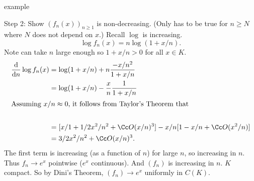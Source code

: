 \documentclass[class=article, crop=false]{standalone}
\begin{document}
\begin{understandingcheck}{example}
\begin{pf}
    Step 2: Show $(f_n(x))_{n \geq 1}$ is non-decreasing. (Only has to be true for $n \geq N$ where $N$ does not depend on $x$.) Recall $\log$ is increasing.
      \[
        \log f_n(x) = n \log (1+x/n).
      \]
    Note can take $n$ large enough so $1+x/n > 0$ for all $x \in K$.
      \begin{align*}
        \frac{\mathrm d}{\mathrm d n} \log f_n(x) &= \log(1+x/n)+ n \frac{-x/n^2}{1+x/n} \\
        &= \log(1+x/n)-\frac{x}{n} \frac{1}{1+x/n} \\
        \intertext{Assuming $x/n \approx 0$, it follows from Taylor's Theorem that } \\
        &= [x/1 + 1/2 x^2/n^2 + \Cc O (x/n)^3] - x/n [1-x/n + \Cc O(x^2/n)] \\
        &= 3/2 x^2/n^2 + \Cc O(x/n)^3.
      \end{align*}
    The first term is increasing (as a function of $n$) for large $n$, so increasing in $n$. Thus $f_n \to e^x$ pointwise ($e^x$ continuous). And $(f_n)$ is increasing in $n$. $K$ compact. So by Dini's Theorem, $(f_n) \to e^x$ uniformly in $C(K)$.
  \end{pf}
\end{understandingcheck}
\end{document}
